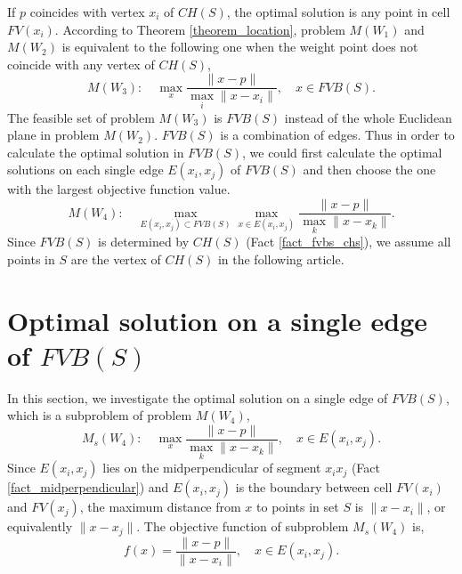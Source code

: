 \documentclass[final,3p,times]{elsarticle}
\begin{document}
If $p$ coincides with vertex $x_i$ of $CH(S)$, the optimal solution is any point in cell $FV(x_i)$. %
According to Theorem \ref{theorem_location}, problem $M(W_1)$ and $M(W_2)$ is equivalent to the following one when the weight point does not coincide with any vertex of $CH(S)$,
\begin{equation}
M(W_3):\quad \max_{x}\frac{\|x-p\|}{\max_{i}\|x-x_i\|}, \quad x\in FVB(S).
\end{equation}
The feasible set of problem $M(W_3)$ is $FVB(S)$ instead of the whole Euclidean plane in problem $M(W_2)$. $FVB(S)$ is a combination of edges. Thus in order to calculate the optimal solution in $FVB(S)$, we could first calculate the optimal solutions on each single edge $E(x_i,x_j)$ of $FVB(S)$ and then choose the one with the largest objective function value.
\begin{equation}
M(W_4):\quad \max_{E(x_i,x_j)\subset FVB(S)}\max_{x\in E(x_i,x_j)}\frac{\|x-p\|}{\max_{k}\|x-x_k\|}.
\end{equation}
Since $FVB(S)$ is determined by $CH(S)$ (Fact \ref{fact_fvbs_chs}), we assume all points in $S$ are the vertex of $CH(S)$ in the following article.
\section{Optimal solution on a single edge of $FVB(S)$}
\label{section_os_single_edge}
In this section, we investigate the optimal solution on a single edge of $FVB(S)$, which is a subproblem of problem $M(W_4)$,
\begin{equation}
M_s(W_4):\quad \max_x\frac{\|x-p\|}{\max_{k}\|x-x_k\|}, \quad x\in E(x_i,x_j).
\end{equation}
Since $E(x_i,x_j)$ lies on the midperpendicular of segment $x_ix_j$ (Fact \ref{fact_midperpendicular}) and $E(x_i,x_j)$ is the boundary between cell $FV(x_i)$ and $FV(x_j)$, the maximum distance from $x$ to points in set $S$ is $\|x-x_i\|$, or equivalently $\|x-x_j\|$. The objective function of subproblem $M_s(W_4)$ is,
\begin{equation*}
f(x) = \frac{\|x-p\|}{\|x-x_i\|}, \quad x\in E(x_i,x_j).
\end{equation*}
\end{document}

